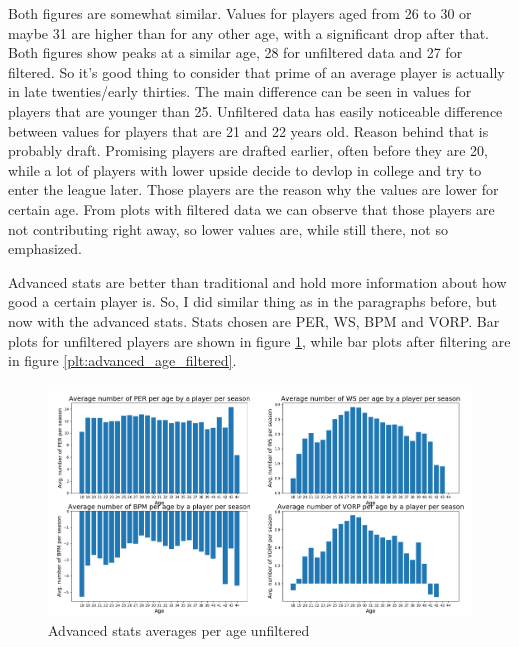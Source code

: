 \documentclass[a4paper]{article}
\begin{document}
Both figures are somewhat similar. Values for players aged from 26 to 30 or maybe 31 are higher than for any other age, with a significant drop after that. Both figures show peaks at a similar age, 28 for unfiltered data and 27 for filtered. So it's good thing to consider that prime of an average player is actually in late twenties/early thirties. The main difference can be seen in values for players that are younger than 25. Unfiltered data has easily noticeable difference between values for players that are 21 and 22 years old. Reason behind that is probably draft. Promising players are drafted earlier, often before they are 20, while a lot of players with lower upside decide to devlop in college and try to enter the league later. Those players are the reason why the values are lower for certain age. From plots with filtered data we can observe that those players are not contributing right away, so lower values are, while still there, not so emphasized.

Advanced stats are better than traditional and hold more information about how good a certain player is. So, I did similar thing as in the paragraphs before, but now with the advanced stats. Stats chosen are PER, WS, BPM and VORP. Bar plots for unfiltered players are shown in figure \ref{plt:advanced_age}, while bar plots after filtering are in figure \ref{plt:advanced_age_filtered}.


\begin{figure}[h!]
\begin{center}
\includegraphics[scale=0.3]{advanced_stats_per_age.png}
\end{center}
\caption{Advanced stats averages per age unfiltered}
\label{plt:advanced_age}
\end{figure}
\end{document}
